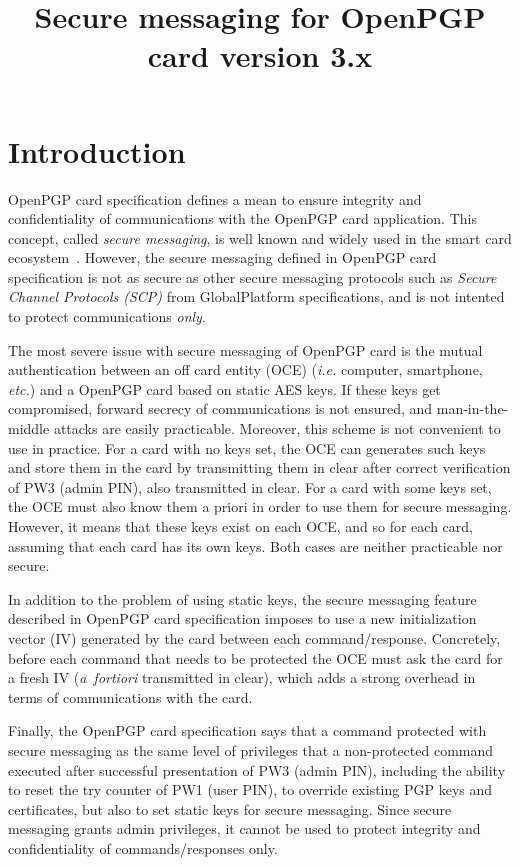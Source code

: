 \documentclass[dvipdfmx,11pt,a4paper,english,final]{article}
\title{Secure messaging for OpenPGP card version 3.x}
\newcommand{\ie}[0]{\textit{i.e.}\xspace}
\newcommand{\etc}[0]{\textit{etc.}\xspace}
\newcommand{\afortiori}[0]{\textit{a~fortiori}\xspace}
\newcommand{\gp}[0]{Glo\-bal\-Plat\-form\xspace}
\begin{document}
\maketitle

\section*{Introduction}

OpenPGP card specification\cite{openpgp-card} defines a mean to ensure
integrity and confidentiality of communications with the OpenPGP card
application. This concept, called \emph{secure messaging}, is well
known and widely used in the smart card ecosystem~\cite{iso7816-4,
  gp-card}. However, the secure messaging defined in OpenPGP card
specification is not as secure as other secure messaging protocols
such as \emph{Secure Channel Protocols (SCP)} from \gp
specifications, and is not intented to protect communications
\emph{only}.

The most severe issue with secure messaging of OpenPGP card is the
mutual authentication between an off card entity (OCE) (\ie
computer, smartphone, \etc) and a OpenPGP card based on static AES
keys. If these keys get compromised, forward secrecy of communications
is not ensured, and man-in-the-middle attacks are easily
practicable. Moreover, this scheme is not convenient to use in
practice.  For a card with no keys set, the OCE can generates such
keys and store them in the card by transmitting them in clear after
correct verification of PW3 (admin PIN), also transmitted in
clear. For a card with some keys set, the OCE must also know them a
priori in order to use them for secure messaging.  However, it means
that these keys exist on each OCE, and so for each card, assuming that
each card has its own keys. Both cases are neither practicable nor
secure.

In addition to the problem of using static keys, the secure messaging
feature described in OpenPGP card specification imposes to use a new
initialization vector (IV) generated by the card between each
command/response. Concretely, before each command that needs to be
protected the OCE must ask the card for a fresh IV (\afortiori
transmitted in clear), which adds a strong overhead in terms of
communications with the card.

Finally, the OpenPGP card specification says that a command protected
with secure messaging as the same level of privileges that a
non-protected command executed after successful presentation of PW3
(admin PIN), including the ability to reset the try counter of PW1
(user PIN), to override existing PGP keys and certificates, but also
to set static keys for secure messaging. Since secure messaging grants
admin privileges, it cannot be used to protect integrity and
confidentiality of commands/responses only.
\end{document}
